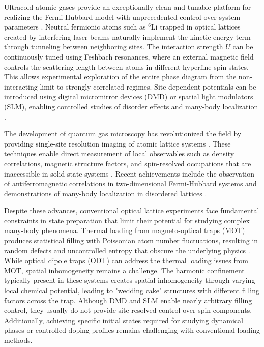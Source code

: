 
Ultracold atomic gases provide an exceptionally clean and tunable platform for realizing the Fermi-Hubbard model with unprecedented control over system parameters \cite{esslinger_fermi-hubbard_2010,gross_quantum_2017}. Neutral fermionic atoms such as $^6$Li trapped in optical lattices created by interfering laser beams naturally implement the kinetic energy term through tunneling between neighboring sites. The interaction strength $U$ can be continuously tuned using Feshbach resonances, where an external magnetic field controls the scattering length between atoms in different hyperfine spin states. This allows experimental exploration of the entire phase diagram from the non-interacting limit to strongly correlated regimes. Site-dependent potentials can be introduced using digital micromirror devices (DMD) or spatial light modulators (SLM), enabling controlled studies of disorder effects and many-body localization \cite{choi_exploring_2016,schreiber_observation_2015}.

The development of quantum gas microscopy has revolutionized the field by providing single-site resolution imaging of atomic lattice systems \cite{bakr_quantum_2009,sherson_single-atom-resolved_2010}. These techniques enable direct measurement of local observables such as density correlations, magnetic structure factors, and spin-resolved occupations that are inaccessible in solid-state systems \cite{gross_quantum_2021}. Recent achievements include the observation of antiferromagnetic correlations in two-dimensional Fermi-Hubbard systems \cite{mazurenko_cold-atom_2017,parsons_site-resolved_2016} and demonstrations of many-body localization in disordered lattices \cite{bordia_probing_2017}.

Despite these advances, conventional optical lattice experiments face fundamental constraints in state preparation that limit their potential for studying complex many-body phenomena. Thermal loading from magneto-optical traps (MOT) produces statistical filling with Poissonian atom number fluctuations, resulting in random defects and uncontrolled entropy that obscure the underlying physics \cite{esslinger_fermi-hubbard_2010}. While optical dipole traps (ODT) can address the thermal loading issues from MOT, spatial inhomogeneity remains a challenge. The harmonic confinement typically present in these systems creates spatial inhomogeneity through varying local chemical potential, leading to "wedding cake" structures with different filling factors across the trap. Although DMD and SLM enable nearly arbitrary filling control, they usually do not provide site-resolved control over spin components. Additionally, achieving specific initial states required for studying dynamical phases or controlled doping profiles remains challenging with conventional loading methods.


